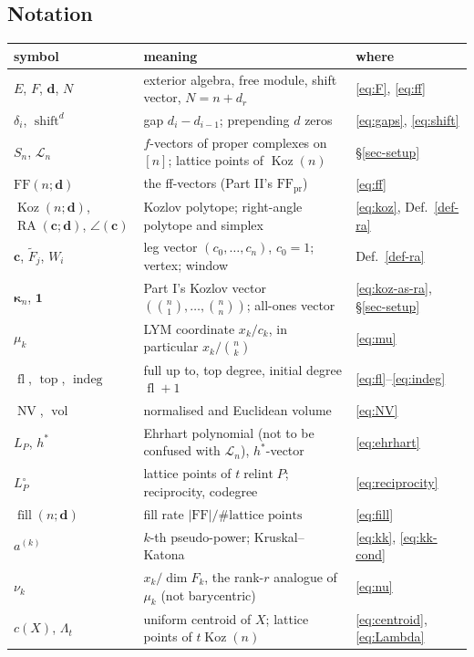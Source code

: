\documentclass[11pt, a4paper, abstract=yes]{scrartcl}
\theoremstyle{definition}
\theoremstyle{remark}
\theoremstyle{plain}
\newcommand{\vek}[1]{\boldsymbol{#1}}
\theoremstyle{remark}
\theoremstyle{plain}
\newcommand{\Koz}{\operatorname{Koz}}
\newcommand{\shift}{\operatorname{shift}}
\newcommand{\indeg}{\operatorname{indeg}}
\newcommand{\tp}{\operatorname{top}}
\newcommand{\rasimp}{\angle}
\newcommand{\RA}{\operatorname{RA}}
\newcommand{\kozvec}{\vek\kappa}
\newcommand{\FF}{\mathrm{FF}}
\newcommand{\NV}{\operatorname{NV}}
\newcommand{\vol}{\operatorname{vol}}
\newcommand{\relint}{\operatorname{relint}}
\newcommand{\fl}{\operatorname{fl}}
\begin{document}
\subsection{Notation}
\label{sec:orgfcc2815}

\begin{center}\footnotesize
\begin{tabular}{@{}lll@{}}
\toprule
symbol & meaning & where\\
\midrule
\(E\), \(F\), \(\vek d\), \(N\) & exterior algebra, free module, shift vector, \(N=n+d_r\) & \eqref{eq:F}, \eqref{eq:ff}\\
\(\delta_i\), \(\shift^d\) & gap \(d_i-d_{i-1}\); prepending \(d\) zeros & \eqref{eq:gaps}, \eqref{eq:shift}\\
\(S_n\), \(\mathcal L_n\) & \(f\)-vectors of proper complexes on \([n]\); lattice points of \(\Koz(n)\) & \S\ref{sec-setup}\\
\(\FF(n;\vek d)\) & the ff-vectors (Part II's \(\FF_{\mathrm{pr}}\)) & \eqref{eq:ff}\\
\(\Koz(n;\vek d)\), \(\RA(\vek c;\vek d)\), \(\rasimp(\vek c)\) & Kozlov polytope; right-angle polytope and simplex & \eqref{eq:koz}, Def.~\ref{def-ra}\\
\(\vek c\), \(\tilde F_j\), \(W_i\) & leg vector \((c_0,\dots,c_n)\), \(c_0=1\); vertex; window & Def.~\ref{def-ra}\\
\(\kozvec_n\), \(\vek 1\) & Part I's Kozlov vector \((\binom n1,\dots,\binom nn)\); all-ones vector & \eqref{eq:koz-as-ra}, \S\ref{sec-setup}\\
\(\mu_k\) & LYM coordinate \(x_k/c_k\), in particular \(x_k/\binom nk\) & \eqref{eq:mu}\\
\(\fl\), \(\tp\), \(\indeg\) & full up to, top degree, initial degree \(\fl+1\) & \eqref{eq:fl}--\eqref{eq:indeg}\\
\(\NV\), \(\vol\) & normalised and Euclidean volume & \eqref{eq:NV}\\
\(L_P\), \(h^*\) & Ehrhart polynomial (not to be confused with \(\mathcal L_n\)), \(h^*\)-vector & \eqref{eq:ehrhart}\\
\(L^\circ_P\) & lattice points of \(t\relint P\); reciprocity, codegree & \eqref{eq:reciprocity}\\
\(\operatorname{fill}(n;\vek d)\) & fill rate \(\lvert\FF\rvert/\#\text{lattice points}\) & \eqref{eq:fill}\\
\(a^{(k)}\) & \(k\)-th pseudo-power; Kruskal--Katona & \eqref{eq:kk}, \eqref{eq:kk-cond}\\
\(\nu_k\) & \(x_k/\dim F_k\), the rank-\(r\) analogue of \(\mu_k\) (not barycentric) & \eqref{eq:nu}\\
\(c(X)\), \(\Lambda_t\) & uniform centroid of \(X\); lattice points of \(t\Koz(n)\) & \eqref{eq:centroid}, \eqref{eq:Lambda}\\
\bottomrule
\end{tabular}
\end{center}
\end{document}
